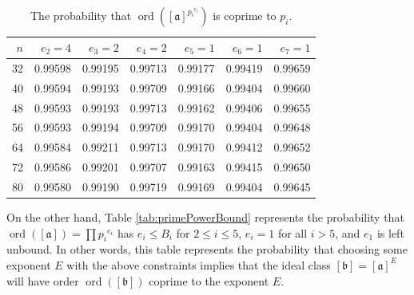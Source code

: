 \documentclass{ucalgthes1}
\theoremstyle{definition}
\DeclareMathOperator{\ord}{ord}
\newcommand{\ideal}{\mathfrak}
\newcommand{\idealclass}[1]{\left[ \ideal #1 \right]}
\newcommand{\aclass}{\idealclass a}
\newcommand{\bclass}{\idealclass b}
\begin{document}
\begin{table}[htb]
\centering
\begin{tabular}{| r | r | r | r | r | r | r |}
	\hline
	$n$ & $e_2 = 4$ & $e_3 = 2$ & $e_4 = 2$ & $e_5 = 1$ & $e_6 = 1$ & $e_7 = 1$ \\
	\hline
32 & 0.99598 & 0.99195 & 0.99713 & 0.99177 & 0.99419 & 0.99659 \\
40 & 0.99594 & 0.99193 & 0.99709 & 0.99166 & 0.99404 & 0.99660 \\
48 & 0.99593 & 0.99193 & 0.99713 & 0.99162 & 0.99406 & 0.99655 \\
56 & 0.99593 & 0.99194 & 0.99709 & 0.99170 & 0.99404 & 0.99648 \\
64 & 0.99584 & 0.99211 & 0.99713 & 0.99170 & 0.99412 & 0.99652 \\
72 & 0.99586 & 0.99201 & 0.99707 & 0.99163 & 0.99415 & 0.99650 \\
80 & 0.99580 & 0.99190 & 0.99719 & 0.99169 & 0.99404 & 0.99645 \\
	\hline
\end{tabular}
\caption{The probability that $\ord(\aclass^{{p_i}^{e_i}})$ is coprime to $p_i$.}
\label{tab:ninetyNine}
\end{table}

On the other hand, Table \ref{tab:primePowerBound} represents the probability that $\ord(\aclass) = \prod {p_i}^{e_i}$ has $e_i \le B_i$ for $2 \le i \le 5$, $e_i = 1$ for all $i > 5$, and $e_1$ is left unbound.  In other words, this table represents the probability that choosing some exponent $E$ with the above constraints implies that the ideal class $\bclass = \aclass ^ E$ will have order $\ord(\bclass)$ coprime to the exponent $E$.
\end{document}
